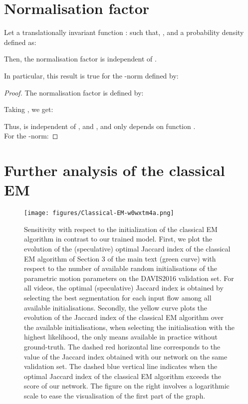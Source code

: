 \documentclass[10pt,twocolumn,letterpaper]{article}
\begin{document}
\section{Normalisation factor}

\begin{theorem}\label{th:z-fac}
Let a translationally invariant function  :  such that, , and a probability density defined as: 


Then, the normalisation factor  is independent of .
\end{theorem}

\vspace{0.5cm}
\noindent In particular, this result is true for the -norm defined by: 

\begin{proof} 
The normalisation factor is defined by: 

Taking , we get:



Thus,  is independent of ,  and , and only depends on function . \\

For the -norm: 
\end{proof}


\section{Further analysis of the classical EM}
\label{classicEM}

\begin{figure}[t!]
\texttt{[image: figures/Classical-EM-w0wxtm4a.png]}
\caption{Sensitivity with respect to the initialization of the classical EM algorithm in contrast to our trained model. First, we plot the evolution of the (speculative) optimal Jaccard index of the classical EM algorithm of Section 3 of the main text (green curve) with respect to the number of available random initialisations of the parametric motion parameters  on the DAVIS2016 validation set. For all videos, the optimal (speculative) Jaccard index is obtained by selecting the best segmentation for each input flow among all available initialisations. Secondly, the yellow curve plots the evolution of the Jaccard index of the classical EM algorithm over the available initialisations, when selecting the initialisation with the highest likelihood, the only means available in practice without ground-truth. The dashed red horizontal line corresponds to the value of the Jaccard index obtained with our network on the same validation set. The dashed blue vertical line indicates when the optimal Jaccard index of the classical EM algorithm exceeds the score of our network. The figure on the right involves a logarithmic scale to ease the visualisation of the first part of the graph.}
\label{fig:classical_EM}
\vspace{-0.2cm}
\end{figure}
\end{document}
